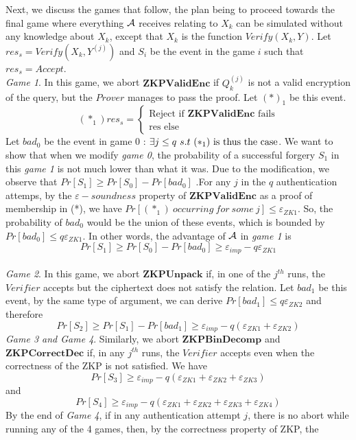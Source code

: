 Next, we discuss the games that follow, the plan being to proceed towards the final game where 
everything $\mathcal{A}$ receives relating to $X_k$ can be simulated
without any knowledge about $X_k$, except that $X_k$ is
the function $Verify(X_k, Y)$. Let $res_s = Verify(X_k, Y^{(j)})$ and $S_i$ be
the event in the game $i$ such that $res_s = Accept$.\\
\textit{Game 1}. In this game, we abort $\mathbf{ZKPValidEnc}$ if $Q_k^{(j)}$
is not a valid encryption of the query, but the $Prover$ manages to pass the
proof. Let $(*)_1$ be this event.
\[
(*_1)res_s = \begin{cases}
\text{Reject if } \mathbf{ZKPValidEnc} \text{ fails}\\
\text{res else}
\end{cases}
\]
Let $bad_0$ be the event in game 0 : $\exists j \leq q\  s.t\  (*_1)\
\textnormal{is thus the case}$. We want to show that when we modify \textit{game 0}, the
probability of a successful forgery $S_1$ in this \textit{game 1} is not much
lower than what it was. Due to the modification, we observe that
$
Pr[S_1] \geq Pr[S_0] - Pr[bad_0]
$
.For any $j$ in the $q$ authentication attemps, by the $\varepsilon-soundness$ property of
$\mathbf{ZKPValidEnc}$ as a proof of membership in (*), we have $Pr[(*_1)\
occurring\ for\ some \ j] \leq \varepsilon_{ZK1}$. So, the probability of $bad_0$
would be the union of these events, which is bounded by $Pr[bad_0] \leq
q\varepsilon_{ZK1}$. In other words, the advantage of $\mathcal{A}$ in \textit{game
	1} is
\[
Pr[S_1] \geq Pr[S_0] - Pr[bad_0] \geq \varepsilon_{imp} - q\varepsilon_{ZK1}
\]
\\
\textit{Game 2}. In this game, we abort $\mathbf{ZKPUnpack}$ if, in one of the
$j^{th}$ runs, the $Verifier$ accepts but the ciphertext does not satisfy the
relation. Let $bad_1$ be this event, by the same type of argument, we can
derive $Pr[bad_1] \leq q\varepsilon_{ZK2}$ and therefore
$$Pr[S_2] \geq Pr[S_1]
- Pr[bad_1] \geq \varepsilon_{imp} - q(\varepsilon_{ZK1}+\varepsilon_{ZK2})
$$
\textit{Game 3 and Game 4}. Similarly, we abort $\mathbf{ZKPBinDecomp}$ and
$\mathbf{ZKPCorrectDec}$ if, in any $j^{th}$ runs, the $Verifier$ accepts even
when the correctness of the ZKP is not satisfied. We have
$$Pr[S_3] \geq  \varepsilon_{imp} - q(\varepsilon_{ZK1}+\varepsilon_{ZK2}
+\varepsilon_{ZK3})
$$ and
$$Pr[S_4] \geq  \varepsilon_{imp} - q(\varepsilon_{ZK1}+\varepsilon_{ZK2} +
\varepsilon_{ZK3} + \varepsilon_{ZK4})
$$
By the end of \textit{Game 4}, if in any authentication attempt $j$, there is
no abort while running any of the 4 games, then, by the correctness property of ZKP, the
